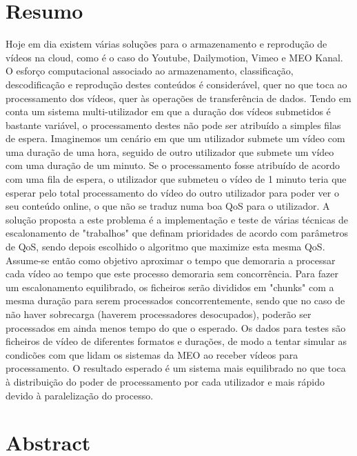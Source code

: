 \chapter*{Resumo}

Hoje em dia existem várias soluções para o armazenamento e reprodução de vídeos na cloud, como é o caso do Youtube, Dailymotion, Vimeo e MEO Kanal.
O esforço computacional associado ao armazenamento, classificação, descodificação e reprodução destes conteúdos é considerável, quer no que toca ao processamento dos vídeos, quer às operações de transferência de dados.
Tendo em conta um sistema multi-utilizador em que a duração dos vídeos submetidos é bastante variável, o processamento destes não pode ser atribuído a simples filas de espera.
Imaginemos um cenário em que um utilizador submete um vídeo com uma duração de uma hora, seguido de outro utilizador que submete um vídeo com uma duração de um minuto. Se o processamento fosse atribuído de acordo com uma fila de espera, o utilizador que submeteu o vídeo de 1 minuto teria que esperar pelo total processamento do vídeo do outro utilizador para poder ver o seu conteúdo online, o que não se traduz numa boa QoS para o utilizador.
A solução proposta a este problema é a implementação e teste de várias técnicas de escalonamento de "trabalhos" que definam prioridades de acordo com parâmetros de QoS, sendo depois escolhido o algoritmo que maximize esta mesma QoS.
Assume-se então como objetivo aproximar o tempo que demoraria a processar cada vídeo ao tempo que este processo demoraria sem concorrência.
Para fazer um escalonamento equilibrado, os ficheiros serão divididos em "chunks" com a mesma duração para serem processados concorrentemente, sendo que no caso de não haver sobrecarga (haverem processadores desocupados), poderão ser processados em ainda menos tempo do que o esperado.
Os dados para testes são ficheiros de vídeo de diferentes formatos e durações, de modo a tentar simular as condicões com que lidam os sistemas da MEO ao receber vídeos para processamento.
O resultado esperado é um sistema mais equilibrado no que toca à distribuição do poder de processamento por cada utilizador e mais rápido devido à paralelização do processo.

\chapter*{Abstract}

